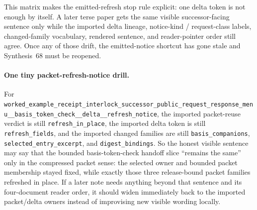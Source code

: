 \documentclass[11pt]{article}
\begin{document}
This matrix makes the emitted-refresh stop rule explicit: one delta token is not enough by itself. A later terse paper gets the same visible successor-facing sentence only while the imported delta lineage, notice-kind / request-class labels, changed-family vocabulary, rendered sentence, and reader-pointer order still agree. Once any of those drift, the emitted-notice shortcut has gone stale and Synthesis~68 must be reopened.\cite{series:workedexample}

\paragraph{One tiny packet-refresh-notice drill.}
For \nolinkurl{worked_example_receipt_interlock_successor_public_request_response_menu__basis_token_check__delta__refresh_notice}, the imported packet-reuse verdict is still \nolinkurl{refresh_in_place}, the imported delta token is still \nolinkurl{refresh_fields}, and the imported changed families are still \nolinkurl{basis_companions}, \nolinkurl{selected_entry_excerpt}, and \nolinkurl{digest_bindings}. So the honest visible sentence may say that the bounded basis-token-check handoff slice ``remains the same'' only in the compressed packet sense: the selected owner and bounded packet membership stayed fixed, while exactly those three release-bound packet families refreshed in place. If a later note needs anything beyond that sentence and its four-document reader order, it should widen immediately back to the imported packet/delta owners instead of improvising new visible wording locally.\cite{series:workedexample}
\end{document}
